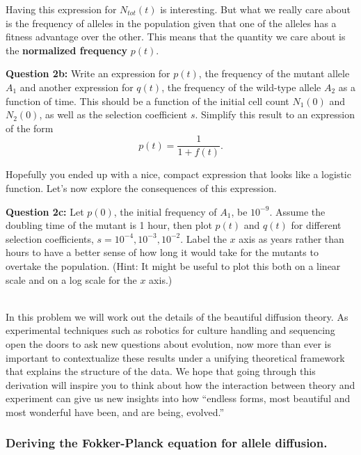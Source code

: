 \documentclass[12pt]{article}    %
\begin{document}
Having this expression for $N_{tot}(t)$ is interesting. But what we really care
about is the frequency of alleles in the population given that one of the
alleles has a fitness advantage over the other. This means that the quantity we
care about is the \textbf{normalized frequency} $p(t)$.

\vspace{5mm}
\textbf{Question 2b:} Write an expression for $p(t)$, the frequency of the
mutant allele $A_1$ and another expression for $q(t)$, the frequency of the
wild-type allele $A_2$ as a function of time. This should be a function of the
initial cell count $N_1(0)$ and $N_2(0)$, as well as the selection coefficient
$s$. Simplify this result to an expression of the form
\begin{equation}
  p(t) = \frac{1}{1 + f(t)}.
\end{equation}
\vspace{5mm}

Hopefully you ended up with a nice, compact expression that looks like a
logistic function. Let's now explore the consequences of this expression.

\vspace{5mm}
\textbf{Question 2c:} Let $p(0)$, the initial frequency of $A_1$, be $10^{-9}$.
Assume the doubling time of the mutant is 1 hour, then plot $p(t)$ and $q(t)$
for different selection coefficients, $s = 10^{-4}, 10^{-3}, 10^{-2}$. Label the
$x$ axis as years rather than hours to have a better sense of how long it would
take for the mutants to overtake the population. (Hint: It might be useful to
plot this both on a linear scale and on a log scale for the $x$ axis.)
\vspace{5mm}

\clearpage
{}\\

\noindent   In this problem we will work out the details of the beautiful
diffusion theory. As experimental techniques such as robotics for culture
handling and sequencing open the doors to ask new questions about evolution, now
more than ever is important to contextualize these results under a unifying
theoretical framework that explains the structure of the data. We hope that
going through this derivation will inspire you to think about how the
interaction between theory and experiment can give us new insights into how
“endless forms, most beautiful and most wonderful have been, and are being,
evolved.”

\subsubsection*{Deriving the Fokker-Planck equation for allele diffusion.}
\end{document}
